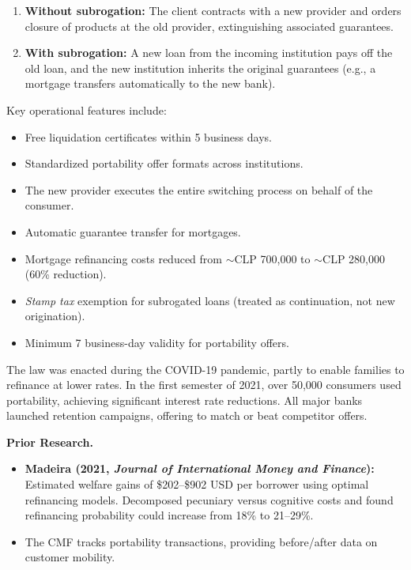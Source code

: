 \documentclass[12pt]{article}
\theoremstyle{plain}
\theoremstyle{plain}
\theoremstyle{definition}  %
\theoremstyle{remark}  %
\begin{document}
\begin{enumerate}
    \item \textbf{Without subrogation:} The client contracts with a new provider and orders closure of products at the old provider, extinguishing associated guarantees.
    \item \textbf{With subrogation:} A new loan from the incoming institution pays off the old loan, and the new institution inherits the original guarantees (e.g., a mortgage transfers automatically to the new bank).
\end{enumerate}

\noindent Key operational features include:
\begin{itemize}
    \item Free liquidation certificates within 5 business days.
    \item Standardized portability offer formats across institutions.
    \item The new provider executes the entire switching process on behalf of the consumer.
    \item Automatic guarantee transfer for mortgages.
    \item Mortgage refinancing costs reduced from $\sim$CLP 700,000 to $\sim$CLP 280,000 (60\% reduction).
    \item \textit{Stamp tax} exemption for subrogated loans (treated as continuation, not new origination).
    \item Minimum 7 business-day validity for portability offers.
\end{itemize}

\noindent The law was enacted during the COVID-19 pandemic, partly to enable families to refinance at lower rates. In the first semester of 2021, over 50,000 consumers used portability, achieving significant interest rate reductions. All major banks launched retention campaigns, offering to match or beat competitor offers.

\medskip
\noindent \textbf{Prior Research.}
\begin{itemize}
    \item \textbf{Madeira (2021, \textit{Journal of International Money and Finance}):} Estimated welfare gains of \$202--\$902 USD per borrower using optimal refinancing models. Decomposed pecuniary versus cognitive costs and found refinancing probability could increase from 18\% to 21--29\%.
    \item The CMF tracks portability transactions, providing before/after data on customer mobility.
\end{itemize}
\end{document}
